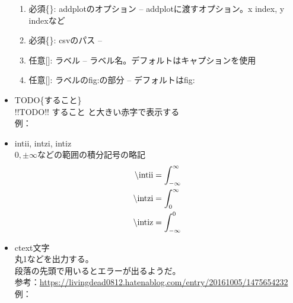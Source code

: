 \documentclass[uplatex, a4paper, dvipdfmx, 12pt]{jsreport}
\begin{document}
\begin{itemize}
\begin{enumerate}
					\item 必須\{\}: addplotのオプション -- addplotに渡すオプション。x index, y indexなど
					\item 必須\{\}: csvのパス -- 
					\item 任意[]: ラベル -- ラベル名。デフォルトはキャプションを使用
					\item 任意[]: ラベルのfig:の部分 -- デフォルトはfig:
				\end{enumerate}
		\item \tbs TODO\{すること\}\\
				!!TODO!! すること と大きい赤字で表示する\\
				例：
		\item \tbs intii, \tbs intzi, \tbs intiz\\
				$0,\pm\infty$などの範囲の積分記号の略記\\
				\begin{equation}
					\begin{split}
						\backslash \mathrm{intii} &= \int_{-\infty}^{\infty}\\
						\backslash \mathrm{intzi} &= \int_{0}^{\infty}\\
						\backslash \mathrm{intiz} &= \int_{-\infty}^{0}
					\end{split}
				\end{equation}
		\item \tbs ctext{文字}\\
				丸1などを出力する。\\
				段落の先頭で用いるとエラーが出るようだ。\\
				参考：\url{https://livingdead0812.hatenablog.com/entry/20161005/1475654232}\\
				例：
	\end{itemize}
\end{document}
